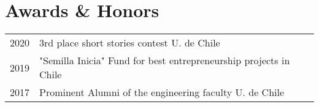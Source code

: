 \section{Awards \& Honors \faTrophy}
\begin{tabular}{r l}
2020 &  3rd place short stories contest U. de Chile\\
2019 & "Semilla Inicia" Fund for best entrepreneurship projects in Chile\\
2017 &  Prominent Alumni of the engineering faculty U. de Chile
\end{tabular}
\sectionsep